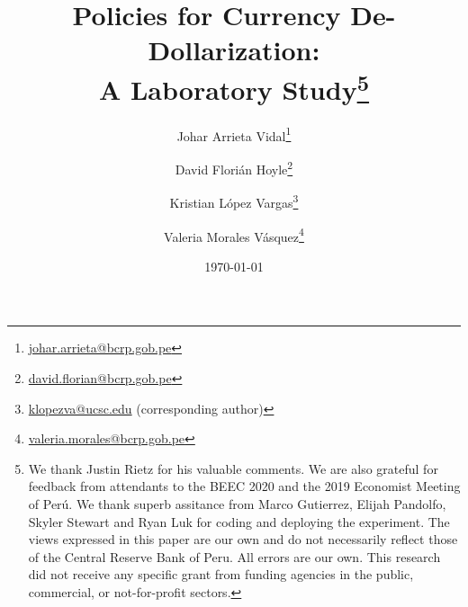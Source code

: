 
\usepackage[subpreambles=true]{standalone}
\usepackage{blindtext}
\usepackage{subfiles} 


\title{
{\textbf{Policies for Currency De-Dollarization: \\ A Laboratory Study}}\thanks{We thank  Justin Rietz for his valuable comments. We are also grateful for feedback from attendants to the BEEC 2020 and the 2019 Economist Meeting of Perú. We thank superb assitance from Marco Gutierrez, Elijah Pandolfo, Skyler Stewart and Ryan Luk for coding and deploying the experiment. 
The views expressed in this paper are our own and do not necessarily reflect those of the Central Reserve Bank of Peru. All errors are our own. 
This research did not receive any specific grant from funding agencies in the public, commercial, or not-for-profit sectors.
}}
\author[1]{Johar Arrieta Vidal\thanks{\href{mailto:johar.arrieta@bcrp.gob.pe}{johar.arrieta@bcrp.gob.pe}}}
\author[1]{David Florián Hoyle\thanks{\href{mailto:david.florian@bcrp.gob.pe}{david.florian@bcrp.gob.pe}}}
\author[2]{Kristian López Vargas\thanks{\href{mailto:klopezva@ucsc.edu}{klopezva@ucsc.edu} (corresponding author)}}
\author[1]{Valeria Morales Vásquez\thanks{\href{mailto:valeria.morales@bcrp.gob.pe}{valeria.morales@bcrp.gob.pe}}}
\renewcommand\Authands{ and }


 


\renewcommand{\baselinestretch}{1}

\date{\today}

\maketitle

